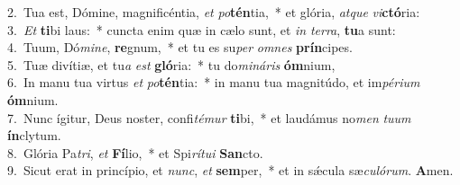 {2.~}Tua est, Dómine, magnificéntia, \textit{et} \textit{po}\textbf{tén}tia,~* et glória, \textit{at}\textit{que} \textit{vi}\textbf{ctó}ria:\\
{3.~}\textit{Et} \textbf{ti}bi laus:~* cuncta enim quæ in cælo sunt, et \textit{in} \textit{ter}\textit{ra}, \textbf{tu}a sunt:\\
{4.~}Tuum, Dó\textit{mi}\textit{ne}, \textbf{re}gnum,~* et tu es su\textit{per} \textit{om}\textit{nes} \textbf{prín}cipes.\\
{5.~}Tuæ divítiæ, et tu\textit{a} \textit{est} \textbf{gló}ria:~* tu do\textit{mi}\textit{ná}\textit{ris} \textbf{óm}nium,\\
{6.~}In manu tua virtus \textit{et} \textit{po}\textbf{tén}tia:~* in manu tua magnitúdo, et im\textit{pé}\textit{ri}\textit{um} \textbf{óm}nium.\\
{7.~}Nunc ígitur, Deus noster, confi\textit{té}\textit{mur} \textbf{ti}bi,~* et laudámus no\textit{men} \textit{tu}\textit{um} \textbf{ín}clytum.\\
{8.~}Glória Pa\textit{tri}, \textit{et} \textbf{Fí}lio,~* et Spi\textit{rí}\textit{tu}\textit{i} \textbf{San}cto.\\
{9.~}Sicut erat in princípio, et \textit{nunc}, \textit{et} \textbf{sem}per,~* et in sǽcula sæ\textit{cu}\textit{ló}\textit{rum}. \textbf{A}men.\\
